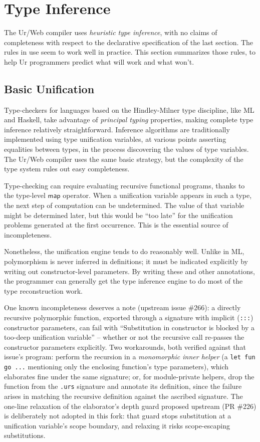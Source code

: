 \documentclass{article}
\newcommand{\cd}[1]{\texttt{#1}}
\newcommand{\mt}[1]{\mathsf{#1}}
\begin{document}
\section{Type Inference}

The Ur/Web compiler uses \emph{heuristic type inference}, with no claims of completeness with respect to the declarative specification of the last section.  The rules in use seem to work well in practice.  This section summarizes those rules, to help Ur programmers predict what will work and what won't.

\subsection{Basic Unification}

Type-checkers for languages based on the Hindley-Milner type discipline, like ML and Haskell, take advantage of \emph{principal typing} properties, making complete type inference relatively straightforward.  Inference algorithms are traditionally implemented using type unification variables, at various points asserting equalities between types, in the process discovering the values of type variables.  The Ur/Web compiler uses the same basic strategy, but the complexity of the type system rules out easy completeness.

Type-checking can require evaluating recursive functional programs, thanks to the type-level $\mt{map}$ operator.  When a unification variable appears in such a type, the next step of computation can be undetermined.  The value of that variable might be determined later, but this would be ``too late'' for the unification problems generated at the first occurrence.  This is the essential source of incompleteness.

Nonetheless, the unification engine tends to do reasonably well.  Unlike in ML, polymorphism is never inferred in definitions; it must be indicated explicitly by writing out constructor-level parameters.  By writing these and other annotations, the programmer can generally get the type inference engine to do most of the type reconstruction work.

One known incompleteness deserves a note (upstream issue \#266): a directly recursive polymorphic function, exported through a signature with implicit (\cd{:::}) constructor parameters, can fail with ``Substitution in constructor is blocked by a too-deep unification variable'' -- whether or not the recursive call re-passes the constructor parameters explicitly.  Two workarounds, both verified against that issue's program: perform the recursion in a \emph{monomorphic inner helper} (a \cd{let fun go ...} mentioning only the enclosing function's type parameters), which elaborates fine under the same signature; or, for module-private helpers, drop the function from the \cd{.urs} signature and annotate its definition, since the failure arises in matching the recursive definition against the ascribed signature.  The one-line relaxation of the elaborator's depth guard proposed upstream (PR \#226) is deliberately not adopted in this fork: that guard stops substitution at a unification variable's scope boundary, and relaxing it risks scope-escaping substitutions.
\end{document}
